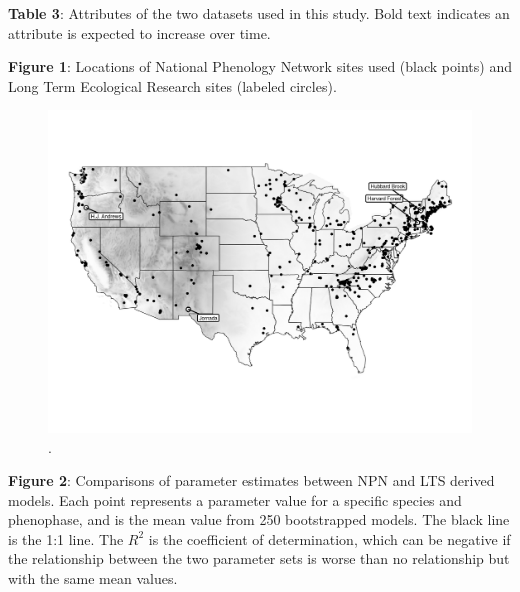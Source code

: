 \documentclass[fleqn,12pt,lineno]{wlpeerj} %
\begin{document}
\textbf{Table 3}: Attributes of the two datasets used in this study. Bold text indicates an attribute is expected to increase over time.



\newpage

\textbf{Figure 1}: Locations of National Phenology Network sites used (black points) and Long Term Ecological Research sites (labeled circles).

\newpage

\begin{figure}[H]
	\centering
	\includegraphics[scale=0.6, angle=90]{figure_site_map.png}
	\caption{.}
\end{figure}


\newpage

\textbf{Figure 2}: Comparisons of parameter estimates between NPN and LTS derived models. Each point represents a parameter value for a specific species and phenophase, and is the mean value from 250 bootstrapped models. The black line is the 1:1 line. The $R^2$ is the coefficient of determination, which can be negative if the relationship between the two parameter sets is worse than no relationship but with the same mean values.

\newpage
\end{document}
